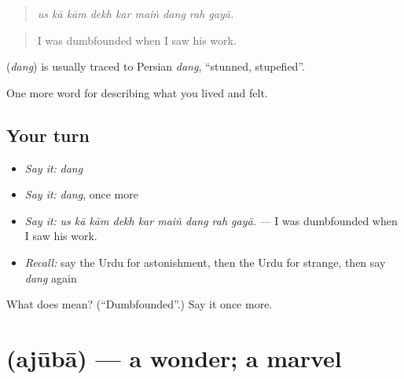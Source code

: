 \begin{quote}
        
\end{quote}

\begin{quote}
\emph{us kā kām dekh kar maiṅ dang rah gayā.}
\end{quote}

\begin{quote}
I was dumbfounded when I saw his work.
\end{quote}

\begin{cousinweb}
\textbf{} (\emph{dang}) is usually traced to Persian \emph{dang}, \textquotedblleft{}stunned, stupefied\textquotedblright{}.
\end{cousinweb}

\begin{grammarlens}[title={What you've built}]
One more word for describing what you lived and felt.
\end{grammarlens}

\subsection*{Your turn}
\begin{itemize}
\raggedright
  \item \emph{Say it:} \emph{dang}
  \item \emph{Say it:} \emph{dang}, once more
  \item \emph{Say it:} \emph{us kā kām dekh kar maiṅ dang rah gayā.} — I was dumbfounded when I saw his work.
  \item \emph{Recall:} say the Urdu for astonishment, then the Urdu for strange, then say \emph{dang} again
\end{itemize}

\begin{tcolorbox}[breakable,colback=teal!4,colframe=teal!35!black,title={Before you move on}]
What does  mean? (\textquotedblleft{}Dumbfounded\textquotedblright{}.) Say it once more.
\end{tcolorbox}
\section[\texorpdfstring{\ur{عجوبہ} (ajūbā)}{عجوبہ (ajūbā)}]{ (ajūbā) — a wonder; a marvel}

\label{lesson:UR-C442-ajuba}



